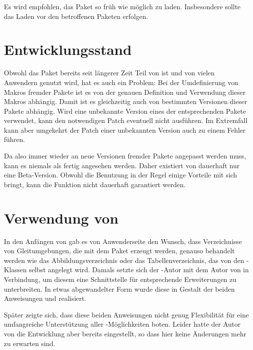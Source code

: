 Es wird empfohlen, das Paket  so früh wie möglich zu
laden. Insbesondere sollte das Laden vor den betroffenen Paketen erfolgen.

\section{Entwicklungsstand}

Obwohl das Paket bereits seit längerer Zeit Teil von \KOMAScript{} ist und
von vielen Anwendern genutzt wird, hat es auch ein Problem: Bei
der Umdefinierung von Makros fremder Pakete ist es von der genauen Definition
und Verwendung dieser Makros abhängig. Damit ist es gleichzeitig auch von
bestimmten Versionen dieser Pakete abhängig. Wird eine unbekannte Version
eines der entsprechenden Pakete verwendet, kann  den
notwendigen Patch eventuell nicht ausführen. Im Extremfall kann aber umgekehrt
der Patch einer unbekannten Version auch zu einem Fehler führen.

Da also  immer wieder an neue Versionen fremder Pakete
angepasst werden muss, kann es niemals als fertig angesehen werden. Daher
existiert von  dauerhaft nur eine Beta-Version. Obwohl die
Benutzung in der Regel einige Vorteile mit sich bringt, kann die Funktion
nicht dauerhaft garantiert werden.


\section{Verwendung von }

In den Anfängen von \KOMAScript{} gab es von Anwenderseite den Wunsch, dass
Verzeichnisse von Gleitumgebungen, die mit dem Paket
 erzeugt werden,
genauso behandelt werden wie das Abbildungsverzeichnis oder das
Tabellenverzeichnis, das von den \KOMAScript-Klassen selbst angelegt
wird. Damals setzte sich der \KOMAScript-Autor mit dem Autor von
 in Verbindung, um diesem eine Schnittstelle für entsprechende
Erweiterungen zu unterbreiten. In etwas abgewandelter Form wurde diese in
Gestalt der beiden Anweisungen
 und
 realisiert.

Später zeigte sich, dass diese beiden Anweisungen nicht genug Flexibilität für
eine umfangreiche Unterstützung aller \KOMAScript-Möglichkeiten boten. Leider
hatte der Autor von  die Entwicklung aber bereits eingestellt,
so dass hier keine Änderungen mehr zu erwarten sind.

